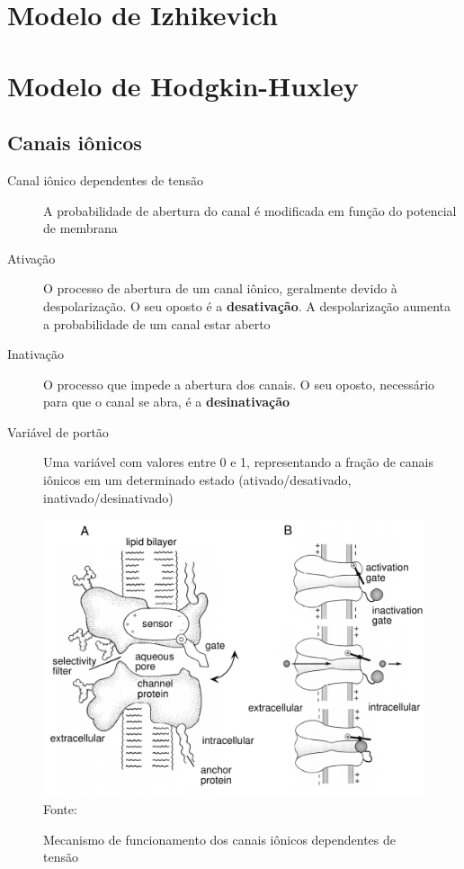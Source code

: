 \section{Modelo de Izhikevich}\label{sec:izhikevich}

\section{Modelo de Hodgkin-Huxley}\label{sec:modelohh}
\subsection{Canais iônicos}
\cite{miller_introductory_2018}
\begin{description}
	\item[Canal iônico dependentes de tensão] A probabilidade de abertura do canal é modificada em função do potencial de membrana
	\item[Ativação] O processo de abertura de um canal iônico, geralmente devido à despolarização. O seu oposto é a \textbf{desativação}. A despolarização aumenta a probabilidade de um canal estar aberto
	\item[Inativação] O processo que impede a abertura dos canais. O seu oposto, necessário para que o canal se abra, é a \textbf{desinativação}
	\item[Variável de portão] Uma variável com valores entre 0 e 1, representando a fração de canais iônicos em um determinado estado (ativado/desativado, inativado/desinativado)
\end{description}

\begin{figure}[htb!]
	\centering
	\caption{Mecanismo de funcionamento dos canais iônicos dependentes de tensão}
	\label{fig:canais}
	\includegraphics[width=0.6\linewidth]{figs/canais}\\
	\small{Fonte: \cite{dayan_theoretical_2001}}
\end{figure}


